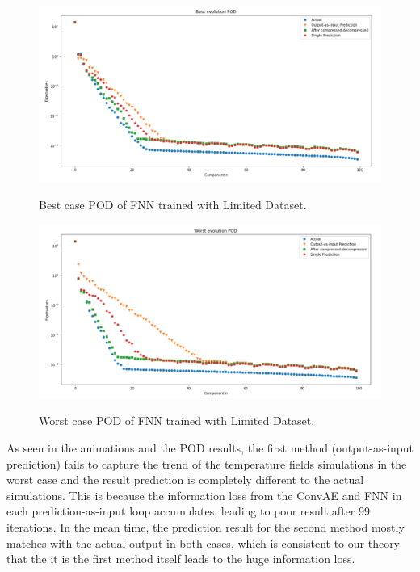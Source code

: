 \begin{figure}[H]
    \caption{Best case POD of FNN trained with Limited Dataset.}
    \includegraphics[scale=0.5]{figures/mantle_convection_images/limited_dataset/FNN_Best_POD.png}
    \label{figure:FNN_limited_best_POD}
\end{figure}

\begin{figure}[H]
    \caption{Worst case POD of FNN trained with Limited Dataset.}
    \includegraphics[scale=0.5]{figures/mantle_convection_images/limited_dataset/FNN_Worst_POD.png}
    \label{figure:FNN_limited_worst_POD}
\end{figure}

As seen in the animations and the POD results, the first method (output-as-input prediction) fails to capture the trend of the temperature fields simulations in the worst case and the result prediction is completely different to the actual simulations. This is because the information loss from the ConvAE and FNN in each prediction-as-input loop accumulates, leading to poor result after 99 iterations. In the mean time, the prediction result for the second method mostly matches with the actual output in both cases, which is consistent to our theory that the it is the first method itself leads to the huge information loss.

